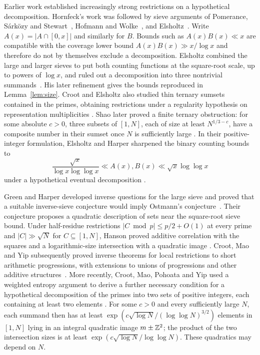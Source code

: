 Earlier work established increasingly strong restrictions on a
hypothetical decomposition.  Hornfeck's work
\cite{Hornfeck1954,Hornfeck1955} was followed by sieve arguments of
Pomerance, S\'ark\"ozy and Stewart~\cite{PomeranceSarkozyStewart1988},
Hofmann and Wolke~\cite{HofmannWolke1996}, and
Elsholtz~\cite{Elsholtz2001Remark}.  Write $A(x)=|A\cap[0,x]|$ and
similarly for $B$.  Bounds such as $A(x)B(x)\ll x$ are compatible with
the coverage lower bound $A(x)B(x)\gg x/\log x$ and therefore do not
by themselves exclude a decomposition.  Elsholtz combined the large
and larger sieves to put both counting functions at the square-root
scale, up to powers of $\log x$, and ruled out a decomposition into
three nontrivial summands~\cite{Elsholtz2001}.  His later refinement
\cite[Theorem~1.9]{Elsholtz2006} gives the bounds reproduced in
Lemma~\ref{lem:size}.  Croot and Elsholtz also studied thin ternary
sumsets contained in the primes, obtaining restrictions under a
regularity hypothesis on representation multiplicities
\cite[Theorem~1]{CrootElsholtz2005}.  Shao later proved a finite ternary
obstruction: for some absolute $c>0$, three subsets of $[1,N]$, each
of size at least $N^{1/3-c}$, have a composite number in their sumset
once $N$ is sufficiently large
\cite[Theorem~1.3 of the preprint version]{Shao2016}.
In their positive-integer formulation,
Elsholtz and Harper sharpened the binary counting bounds to
\[
 \frac{\sqrt x}{\log x\log\log x}
 \ll A(x),B(x)\ll\sqrt x\log\log x
\]
under a hypothetical eventual decomposition
\cite[Theorem~2.6]{ElsholtzHarper}.

Green and Harper developed inverse questions for the large sieve and
proved that a suitable inverse-sieve conjecture would imply Ostmann's
conjecture~\cite[Conjecture~1.5 and Theorem~1.8]{GreenHarper}.
Their conjecture proposes a quadratic description of sets near the
square-root sieve bound.  Under half-residue restrictions
$|C\bmod p|\le p/2+O(1)$ at every prime and $|C|\gg\sqrt N$ for
$C\subseteq[1,N]$, Hanson proved additive correlation with the squares
and a logarithmic-size intersection with a quadratic image
\cite[Theorem~1.2 and Corollary~1.3]{Hanson2020}.
Croot, Mao and Yip subsequently proved inverse theorems for local
restrictions to short arithmetic progressions, with extensions to unions
of progressions and other additive structures~\cite{CrootMaoYip2025}.
More recently, Croot, Mao, Pohoata and Yip used a weighted entropy
argument to derive a further necessary condition for a hypothetical
decomposition of the primes into two sets of positive integers, each
containing at least two elements
\cite[Theorem~1.10 and Corollary~1.11]{CrootMaoPohoataYip2026}.
For some $c>0$ and every sufficiently large $N$, each summand then has at
least $\exp(c\sqrt{\log N}/(\log\log N)^{3/2})$ elements in $[1,N]$
lying in an integral quadratic image $m\pm\mathbb Z^2$; the product of the two
intersection sizes is at least
$\exp(c\sqrt{\log N}/\log\log N)$.  These quadratics may depend on $N$.


